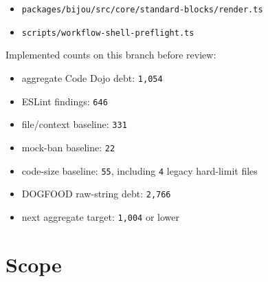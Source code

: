 \begin{itemize}
\item
  \texttt{p\allowbreak{}a\allowbreak{}c\allowbreak{}k\allowbreak{}a\allowbreak{}g\allowbreak{}e\allowbreak{}s\allowbreak{}/\allowbreak{}b\allowbreak{}i\allowbreak{}j\allowbreak{}o\allowbreak{}u\allowbreak{}/\allowbreak{}s\allowbreak{}r\allowbreak{}c\allowbreak{}/\allowbreak{}c\allowbreak{}o\allowbreak{}r\allowbreak{}e\allowbreak{}/\allowbreak{}s\allowbreak{}t\allowbreak{}a\allowbreak{}n\allowbreak{}d\allowbreak{}a\allowbreak{}r\allowbreak{}d\allowbreak{}-\allowbreak{}b\allowbreak{}l\allowbreak{}o\allowbreak{}c\allowbreak{}k\allowbreak{}s\allowbreak{}/\allowbreak{}r\allowbreak{}e\allowbreak{}n\allowbreak{}d\allowbreak{}e\allowbreak{}r\allowbreak{}.\allowbreak{}t\allowbreak{}s}
\item
  \texttt{s\allowbreak{}c\allowbreak{}r\allowbreak{}i\allowbreak{}p\allowbreak{}t\allowbreak{}s\allowbreak{}/\allowbreak{}w\allowbreak{}o\allowbreak{}r\allowbreak{}k\allowbreak{}f\allowbreak{}l\allowbreak{}o\allowbreak{}w\allowbreak{}-\allowbreak{}s\allowbreak{}h\allowbreak{}e\allowbreak{}l\allowbreak{}l\allowbreak{}-\allowbreak{}p\allowbreak{}r\allowbreak{}e\allowbreak{}f\allowbreak{}l\allowbreak{}i\allowbreak{}g\allowbreak{}h\allowbreak{}t\allowbreak{}.\allowbreak{}t\allowbreak{}s}
\end{itemize}

Implemented counts on this branch before review:

\begin{itemize}
\tightlist
\item
  aggregate Code Dojo debt: \texttt{1\allowbreak{},\allowbreak{}0\allowbreak{}5\allowbreak{}4}
\item
  ESLint findings: \texttt{6\allowbreak{}4\allowbreak{}6}
\item
  file/context baseline: \texttt{3\allowbreak{}3\allowbreak{}1}
\item
  mock-ban baseline: \texttt{2\allowbreak{}2}
\item
  code-size baseline: \texttt{5\allowbreak{}5}, including \texttt{4} legacy hard-limit files
\item
  DOGFOOD raw-string debt: \texttt{2\allowbreak{},\allowbreak{}7\allowbreak{}6\allowbreak{}6}
\item
  next aggregate target: \texttt{1\allowbreak{},\allowbreak{}0\allowbreak{}0\allowbreak{}4} or lower
\end{itemize}

\section{Scope}\label{record-234-scope}


